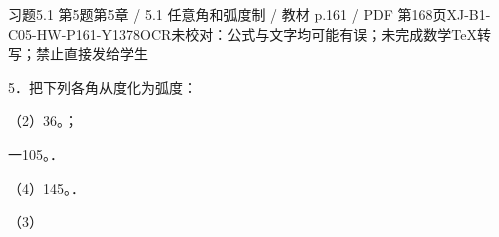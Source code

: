 \begin{bankitem}{习题5.1 第5题}{第5章 / 5.1 任意角和弧度制 / 教材 p.161 / PDF 第168页}{XJ-B1-C05-HW-P161-Y1378}{OCR未校对：公式与文字均可能有误；未完成数学TeX转写；禁止直接发给学生}
\begin{ocrdraft}
\par
5．把下列各角从度化为弧度：
\par
（2）36。；
\par
一105。．
\par
（4）145。．
\par
（3）
\end{ocrdraft}
\end{bankitem}
